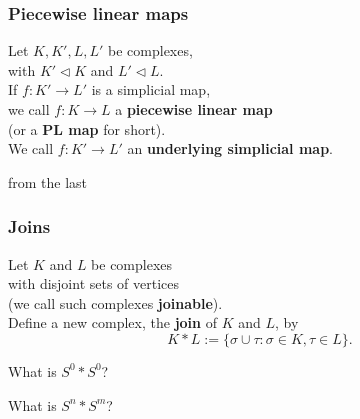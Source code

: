 \documentclass[14pt]{beamer}
\newcommand{\join}{\ast}
\newcommand{\subdivided}{\triangleleft}
\newcommand{\setbackgroundpicture}[1]{%
\usebackgroundtemplate{
\begin{pgfpicture}{0in}{0in}{\paperwidth}{\paperheight}
\pgfputat{\pgfxy(0,0)}{\texttt{[image: \#1]}}
\color{white}
\pgfsetfillopacity{0.8}
\pgfrect[fill]{\pgfxy(0,0)}{\pgfpoint{\paperwidth}{\paperheight}}
\end{pgfpicture}
}
}
\newcommand{\clearbackgroundpicture}{\usebackgroundtemplate{}}
\begin{document}
\begin{frame}
\frametitle{Piecewise linear maps}

\begin{definition}
  Let $K, K', L, L'$ be complexes, \\
  \quad with $K' \subdivided K$ and $L' \subdivided L$.  \\
  \vspace{1ex}
  If $f : K' \to L'$ is a simplicial map, \\
  we call $f : K \to L$ a \textbf{piecewise linear map} \\
  \quad (or a \textbf{PL map} for short). \\
  \vspace{1ex}
  We call $f : K' \to L'$ an \textbf{underlying simplicial map}.
  
\end{definition}

\end{frame}


\setbackgroundpicture{problem02.pdf}
\begin{frame}
\vfill
\begin{center}
from the last \\
\scalebox{4}{homework}
\end{center}
\vfill
\end{frame}
\clearbackgroundpicture

\begin{frame}
  \frametitle{Joins}

  \begin{definition}
Let $K$ and $L$ be complexes\\
with disjoint sets of vertices\\
\quad (we call such complexes \textbf{joinable}).\\
Define a new complex, the \textbf{join} of $K$ and $L$, by 
$$
K \join L := \{ \sigma \cup \tau : \sigma \in K, \tau \in L \}.
$$
\end{definition}
\pause

\begin{problem}
What is $S^0 \join S^0$?
\end{problem}

\pause
\begin{problem}
What is $S^n \join S^m$?
\end{problem}

\end{frame}
\end{document}
